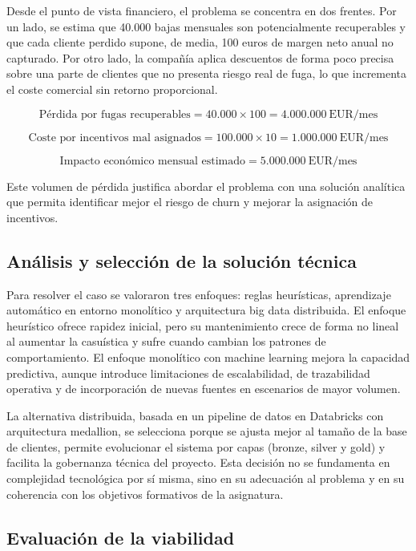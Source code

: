 ﻿\documentclass[12pt,a4paper]{article}
\begin{document}
Desde el punto de vista financiero, el problema se concentra en dos frentes. Por un lado, se estima que 40.000 bajas mensuales son potencialmente recuperables y que cada cliente perdido supone, de media, 100 euros de margen neto anual no capturado. Por otro lado, la compañía aplica descuentos de forma poco precisa sobre una parte de clientes que no presenta riesgo real de fuga, lo que incrementa el coste comercial sin retorno proporcional.

\[
\text{Pérdida por fugas recuperables} = 40.000 \times 100 = 4.000.000\ \text{EUR/mes}
\]

\[
\text{Coste por incentivos mal asignados} = 100.000 \times 10 = 1.000.000\ \text{EUR/mes}
\]

\[
\text{Impacto económico mensual estimado} = 5.000.000\ \text{EUR/mes}
\]

Este volumen de pérdida justifica abordar el problema con una solución analítica que permita identificar mejor el riesgo de churn y mejorar la asignación de incentivos.

\subsection{Análisis y selección de la solución técnica}

Para resolver el caso se valoraron tres enfoques: reglas heurísticas, aprendizaje automático en entorno monolítico y arquitectura big data distribuida. El enfoque heurístico ofrece rapidez inicial, pero su mantenimiento crece de forma no lineal al aumentar la casuística y sufre cuando cambian los patrones de comportamiento. El enfoque monolítico con machine learning mejora la capacidad predictiva, aunque introduce limitaciones de escalabilidad, de trazabilidad operativa y de incorporación de nuevas fuentes en escenarios de mayor volumen.

La alternativa distribuida, basada en un pipeline de datos en Databricks con arquitectura medallion, se selecciona porque se ajusta mejor al tamaño de la base de clientes, permite evolucionar el sistema por capas (bronze, silver y gold) y facilita la gobernanza técnica del proyecto. Esta decisión no se fundamenta en complejidad tecnológica por sí misma, sino en su adecuación al problema y en su coherencia con los objetivos formativos de la asignatura.

\subsection{Evaluación de la viabilidad}
\end{document}
